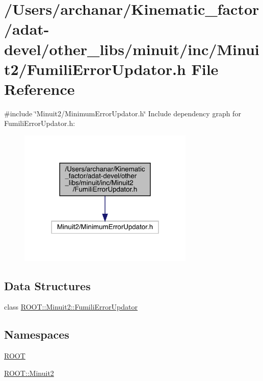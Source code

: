 \hypertarget{adat-devel_2other__libs_2minuit_2inc_2Minuit2_2FumiliErrorUpdator_8h}{}\section{/\+Users/archanar/\+Kinematic\+\_\+factor/adat-\/devel/other\+\_\+libs/minuit/inc/\+Minuit2/\+Fumili\+Error\+Updator.h File Reference}
\label{adat-devel_2other__libs_2minuit_2inc_2Minuit2_2FumiliErrorUpdator_8h}
{\ttfamily \#include \char`\"{}Minuit2/\+Minimum\+Error\+Updator.\+h\char`\"{}}\newline
Include dependency graph for Fumili\+Error\+Updator.\+h\+:
\nopagebreak
\begin{figure}[H]
\begin{center}
\leavevmode
\includegraphics[width=237pt]{d9/d53/adat-devel_2other__libs_2minuit_2inc_2Minuit2_2FumiliErrorUpdator_8h__incl}
\end{center}
\end{figure}
\subsection*{Data Structures}
\begin{DoxyCompactItemize}
\item 
class \mbox{\hyperlink{classROOT_1_1Minuit2_1_1FumiliErrorUpdator}{R\+O\+O\+T\+::\+Minuit2\+::\+Fumili\+Error\+Updator}}
\end{DoxyCompactItemize}
\subsection*{Namespaces}
\begin{DoxyCompactItemize}
\item 
 \mbox{\hyperlink{namespaceROOT}{R\+O\+OT}}
\item 
 \mbox{\hyperlink{namespaceROOT_1_1Minuit2}{R\+O\+O\+T\+::\+Minuit2}}
\end{DoxyCompactItemize}
